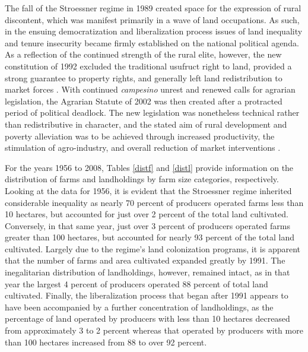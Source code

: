 \documentclass[english]{article}
\begin{document}
The fall of the Stroessner regime in 1989 created space for the expression of 
rural discontent, which was manifest primarily in a wave of land occupations.
As such, in the ensuing democratization and liberalization process issues of  
land inequality and tenure insecurity became firmly established on the national 
political agenda.
As a reflection of the continued strength of the rural elite, however, the new 
constitution of 1992 excluded the traditional usufruct right to land, provided a 
strong guarantee to property rights, and generally left land redistribution to 
market forces \citep{nagel1999, danielsen2009}.
With continued \emph{campesino} unrest and renewed calls for agrarian 
legislation, the Agrarian Statute of 2002 was then created after a protracted 
period of political deadlock.
The new legislation was nonetheless technical rather than redistributive in 
character, and the stated aim of rural development and poverty alleviation 
was to be achieved through increased productivity, the stimulation of
agro-industry, and overall reduction of market interventions 
\citep{danielsen2009}.

For the years 1956 to 2008, Tables \ref{distf} and \ref{distl} provide 
information on the distribution of farms and landholdings by farm size 
categories, respectively. 
Looking at the data for 1956, it is evident that the Stroessner regime 
inherited considerable inequality as nearly 70 percent of producers 
operated farms less than 10 hectares, but accounted for just over 2 percent 
of the total land cultivated.
Conversely, in that same year, just over 3 percent of producers operated
farms greater than 100 hectares, but accounted for nearly 93 percent
of the total land cultivated.
Largely due to the regime's land colonization programs, it is apparent that 
the number of farms and area cultivated expanded greatly by 1991. 
The inegalitarian distribution of landholdings, however, remained intact, as in 
that year the largest 4 percent of producers operated 88 percent of total 
land cultivated.
Finally, the liberalization process that began after 1991 appears to have been
accompanied by a further concentration of landholdings, as the percentage of 
land operated by producers with less than 10 hectares decreased from 
approximately 3 to 2 percent whereas that operated by producers with more 
than 100 hectares increased from 88 to over 92 percent.

\end{document}
